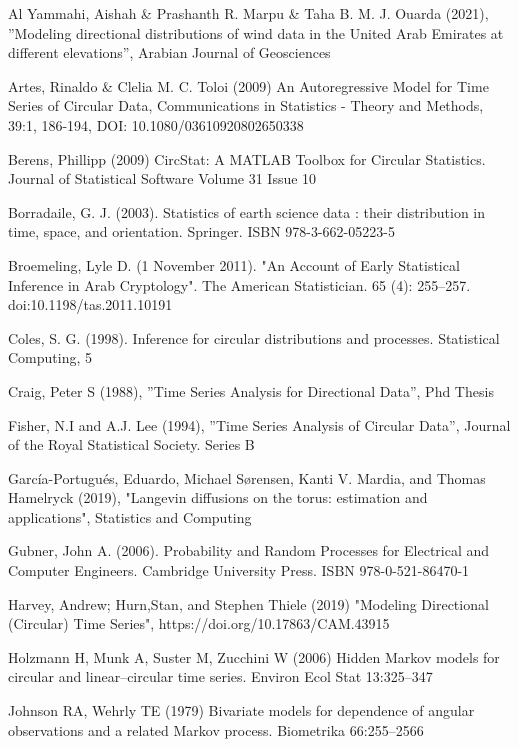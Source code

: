 \documentclass[12pt]{article}
\numberwithin{equation}{section}
\numberwithin{figure}{section}
\begin{document}
\begin{thebibliography}{1}

 Al Yammahi, Aishah \& Prashanth R. Marpu \& Taha B. M. J. Ouarda (2021), ''Modeling directional distributions of wind data in the United
Arab Emirates at different elevations'', Arabian Journal of Geosciences

 Artes, Rinaldo \& Clelia M. C. Toloi (2009) An Autoregressive Model for Time
Series of Circular Data, Communications in Statistics - Theory and Methods, 39:1, 186-194, DOI:
10.1080/03610920802650338

 Berens, Phillipp (2009) CircStat: A MATLAB Toolbox for Circular Statistics. Journal of Statistical Software Volume 31 Issue 10

 Borradaile, G. J. (2003). Statistics of earth science data : their distribution in time, space, and orientation. Springer. ISBN 978-3-662-05223-5

 Broemeling, Lyle D. (1 November 2011). "An Account of Early Statistical Inference in Arab Cryptology". The American Statistician. 65 (4): 255–257. doi:10.1198/tas.2011.10191

 Coles, S. G. (1998). Inference for circular distributions and processes. Statistical Computing, 5

 Craig, Peter S (1988), ''Time Series Analysis for Directional Data'', Phd Thesis

 Fisher, N.I and A.J. Lee (1994), ''Time Series Analysis of Circular Data'', Journal of the Royal Statistical Society. Series B

  García-Portugués, Eduardo, Michael Sørensen, Kanti V. Mardia, and Thomas Hamelryck (2019), "Langevin diffusions on the torus: estimation and applications", Statistics and Computing

Gubner, John A. (2006). Probability and Random Processes for Electrical and Computer Engineers. Cambridge University Press. ISBN 978-0-521-86470-1

 Harvey, Andrew; Hurn,Stan, and Stephen Thiele (2019) "Modeling Directional (Circular) Time Series", https://doi.org/10.17863/CAM.43915

 Holzmann H, Munk A, Suster M, Zucchini W (2006) Hidden Markov models for circular and linear–circular
time series. Environ Ecol Stat 13:325–347

 Johnson RA, Wehrly TE (1979) Bivariate models for dependence of angular observations and a
related Markov process. Biometrika 66:255–2566


\end{thebibliography}
\end{document}
